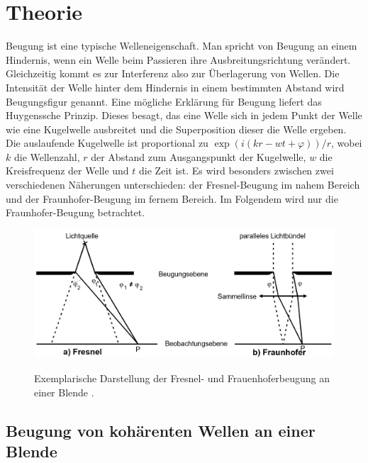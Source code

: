 
\section{Theorie}
\label{sec:Theorie}

Beugung ist eine typische Welleneigenschaft. Man spricht von Beugung an einem Hindernis, wenn ein Welle beim Passieren ihre Ausbreitungsrichtung verändert. Gleichzeitig kommt es zur Interferenz also zur Überlagerung von Wellen. Die Intensität der Welle hinter dem Hindernis in einem bestimmten Abstand wird Beugungsfigur genannt. Eine mögliche Erklärung für Beugung liefert das Huygenssche Prinzip. Dieses besagt, das eine Welle sich in jedem Punkt der Welle wie eine Kugelwelle ausbreitet und die Superposition dieser die Welle ergeben. Die auslaufende Kugelwelle ist proportional zu $\exp(i (k r -w t+\varphi))/r$, wobei $k$ die Wellenzahl, $r$ der Abstand zum Ausgangspunkt der Kugelwelle, $w$ die Kreisfrequenz der Welle und $t$ die Zeit ist. Es wird besonders zwischen zwei verschiedenen Näherungen unterschieden: der Fresnel-Beugung im nahem Bereich und der Fraunhofer-Beugung im fernem Bereich. Im Folgendem wird nur die Fraunhofer-Beugung betrachtet.
\begin{figure}
	\centering
	\caption{Exemplarische Darstellung der Fresnel- und Frauenhoferbeugung an einer Blende \cite{V406}.}
	\includegraphics[width=\linewidth-150pt,height=\textheight-150pt,keepaspectratio]{content/images/FresnelFrauenhoferBeugung.png}
	\label{fig:FFB}
\end{figure}

\subsection{Beugung von kohärenten Wellen an einer Blende}

